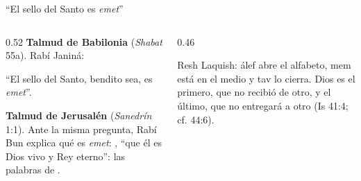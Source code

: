 \begin{frame}{``El sello del Santo es \emph{emet}''}
\begin{columns}[t,onlytextwidth]
\begin{column}{0.52\textwidth}\small
\textbf{Talmud de Babilonia} (\emph{Shabat} 55a). Rabí Janiná:
\begin{center}\end{center}
``El sello del Santo, bendito sea, es \emph{emet}''.\par\medskip
\textbf{Talmud de Jerusalén} (\emph{Sanedrín} 1:1). Ante la misma pregunta, Rabí Bun explica qué es \emph{emet}: , ``que él es Dios vivo y Rey eterno'': las palabras de .
\end{column}
\begin{column}{0.46\textwidth}
\centering
{}\par\smallskip
\scriptsize Resh Laquish: álef abre el alfabeto, mem está en el medio y tav lo cierra. Dios es el primero, que no recibió de otro, y el último, que no entregará a otro (Is 41:4; cf. 44:6).\par\smallskip
{}
\end{column}
\end{columns}
\end{frame}

